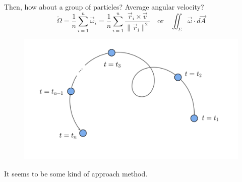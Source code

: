 \documentclass[11pt,]{beamer}
\begin{document}
\begin{frame}
	Then, how about a group of particles? Average angular velocity?
	\begin{equation}
	\tilde{\Omega} = \frac{1}{n}\sum_{i=1}^{n}\vec{\omega}_i 
	= \frac{1}{n}\sum_{i=1}^{n}\frac{\vec{r}_i\times\vec{v}}{\lVert \vec{r}_i\lVert^2}
	\quad\text{or}\quad
	\iint_{\Sigma} \vec{\omega} \cdot d\vec{A}
	\end{equation}

	\begin{figure}
    \includegraphics[page=4, width=0.65\linewidth]{imgs.pdf}
	\end{figure}
	
	It seems to be some kind of approach method.
\end{frame}
\end{document}
